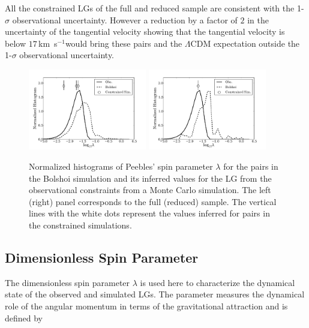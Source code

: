 \documentclass{emulateapj}
\newcommand{\kms}{\,km~s$^{-1}$}
\begin{document}
All the constrained LGs of the full and reduced sample are
consistent with the 1-$\sigma$ observational uncertainty.  However a
reduction by a factor of $2$ in the uncertainty of the tangential
velocity showing that the tangential velocity is below $17$\kms would
bring these pairs and the $\Lambda$CDM expectation outside the
1-$\sigma$ observational uncertainty.  


\begin{figure}
\begin{center}
\includegraphics[keepaspectratio=true,width=0.46\textwidth]{./figures/test_lambda_BDM.pdf}
\includegraphics[keepaspectratio=true,width=0.46\textwidth]{./figures/test_lambda_BDM_narrow.pdf}
\caption{{\rm \label{fig:lambda} Normalized histograms of Peebles'
    spin parameter $\lambda$ for the pairs in the Bolshoi simulation
    and its inferred values for the LG from the observational
    constraints from a Monte Carlo simulation. The left (right) panel
    corresponds to the full (reduced) sample. The vertical lines with
    the white dots   represent the values inferred for pairs in the
    constrained 
    simulations.}} 
\label{fig:lambda}
\end{center}
\end{figure}



\subsection{Dimensionless Spin Parameter}

The dimensionless 
spin parameter $\lambda$ \citep{Peebles1971} is used here to
characterize the dynamical state of the observed and simulated
LGs. The parameter measures the dynamical role of the angular momentum
in terms of the gravitational attraction and is defined by 
\end{document}
